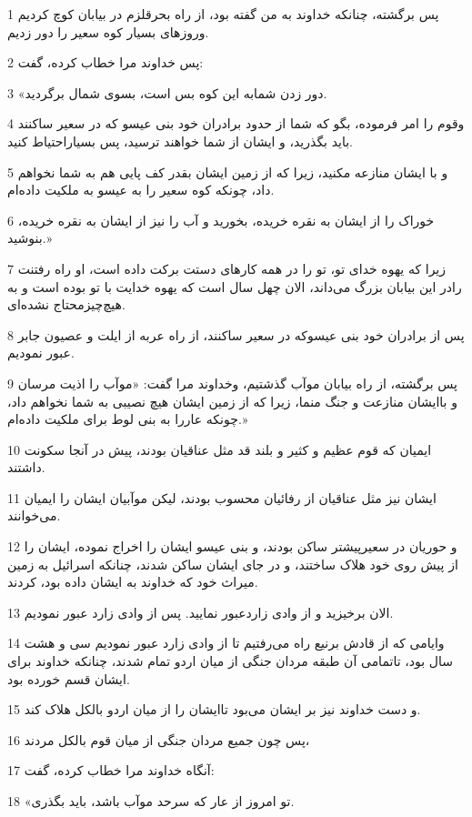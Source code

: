 \par 1 پس برگشته، چنانکه خداوند به من گفته بود، از راه بحرقلزم در بیابان کوچ کردیم وروزهای بسیار کوه سعیر را دور زدیم.
\par 2 پس خداوند مرا خطاب کرده، گفت:
\par 3 «دور زدن شمابه این کوه بس است، بسوی شمال برگردید.
\par 4 وقوم را امر فرموده، بگو که شما از حدود برادران خود بنی عیسو که در سعیر ساکنند باید بگذرید، و ایشان از شما خواهند ترسید، پس بسیاراحتیاط کنید.
\par 5 و با ایشان منازعه مکنید، زیرا که از زمین ایشان بقدر کف پایی هم به شما نخواهم داد، چونکه کوه سعیر را به عیسو به ملکیت داده‌ام.
\par 6 خوراک را از ایشان به نقره خریده، بخورید و آب را نیز از ایشان به نقره خریده، بنوشید.»
\par 7 زیرا که یهوه خدای تو، تو را در همه کارهای دستت برکت داده است، او راه رفتنت رادر این بیابان بزرگ می‌داند، الان چهل سال است که یهوه خدایت با تو بوده است و به هیچ‌چیزمحتاج نشده‌ای.
\par 8 پس از برادران خود بنی عیسوکه در سعیر ساکنند، از راه عربه از ایلت و عصیون جابر عبور نمودیم.
\par 9 پس برگشته، از راه بیابان موآب گذشتیم، وخداوند مرا گفت: «موآب را اذیت مرسان و باایشان منازعت و جنگ منما، زیرا که از زمین ایشان هیچ نصیبی به شما نخواهم داد، چونکه عاررا به بنی لوط برای ملکیت داده‌ام.»
\par 10 ایمیان که قوم عظیم و کثیر و بلند قد مثل عناقیان بودند، پیش در آنجا سکونت داشتند.
\par 11 ایشان نیز مثل عناقیان از رفائیان محسوب بودند، لیکن موآبیان ایشان را ایمیان می‌خوانند.
\par 12 و حوریان در سعیرپیشتر ساکن بودند، و بنی عیسو ایشان را اخراج نموده، ایشان را از پیش روی خود هلاک ساختند، و در جای ایشان ساکن شدند، چنانکه اسرائیل به زمین میراث خود که خداوند به ایشان داده بود، کردند.
\par 13 الان برخیزید و از وادی زاردعبور نمایید. پس از وادی زارد عبور نمودیم.
\par 14 وایامی که از قادش برنیع راه می‌رفتیم تا از وادی زارد عبور نمودیم سی و هشت سال بود، تاتمامی آن طبقه مردان جنگی از میان اردو تمام شدند، چنانکه خداوند برای ایشان قسم خورده بود.
\par 15 و دست خداوند نیز بر ایشان می‌بود تاایشان را از میان اردو بالکل هلاک کند.
\par 16 پس چون جمیع مردان جنگی از میان قوم بالکل مردند،
\par 17 آنگاه خداوند مرا خطاب کرده، گفت:
\par 18 «تو امروز از عار که سرحد موآب باشد، باید بگذری.
